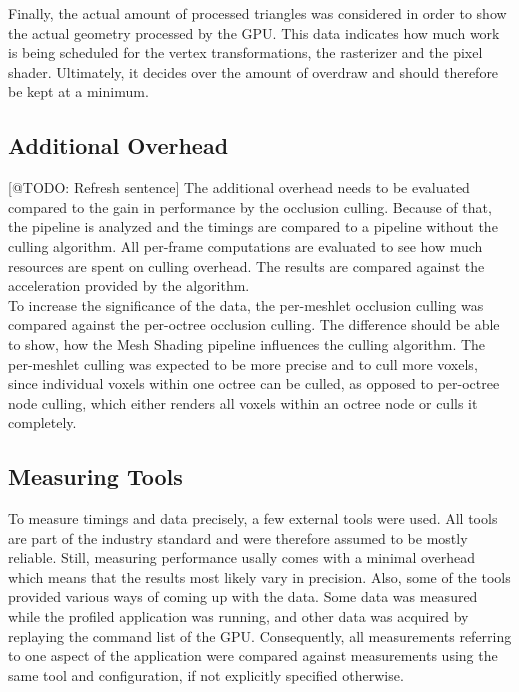\noindent
Finally, the actual amount of processed triangles was considered in order to show the actual geometry processed 
by the \ac{GPU}. This data indicates how much work is being scheduled for the vertex transformations, the rasterizer 
and the pixel shader. Ultimately, it decides over the amount of overdraw and should therefore be kept at a minimum.


\subsection*{Additional Overhead} \label{subsec-additional-overhead}

[@TODO: Refresh sentence]
The additional overhead needs to be evaluated compared to the gain in performance by the occlusion culling. 
Because of that, the pipeline is analyzed and the timings are compared to a pipeline without the culling 
algorithm. All per-frame computations are evaluated to see how much resources are spent on culling overhead. 
The results are compared against the acceleration provided by the algorithm.\\

\noindent
To increase the significance of the data, the per-meshlet occlusion culling was compared against the 
per-octree occlusion culling. The difference should be able to show, how the Mesh Shading pipeline 
influences the culling algorithm. The per-meshlet culling was expected to be more precise and to cull 
more voxels, since individual voxels within one octree can be culled, as opposed to per-octree node 
culling, which either renders all voxels within an octree node or culls it completely. 


\subsection*{Measuring Tools} \label{subsec-measuring-tools}

To measure timings and data precisely, a few external tools were used. All tools are part of the industry 
standard and were therefore assumed to be mostly reliable. Still, measuring performance usally comes with 
a minimal overhead which means that the results most likely vary in precision. Also, some of the tools 
provided various ways of coming up with the data. Some data was measured while the profiled application 
was running, and other data was acquired by replaying the command list of the \ac{GPU}. Consequently, all 
measurements referring to one aspect of the application were compared against measurements using the same 
tool and configuration, if not explicitly specified otherwise. \\

